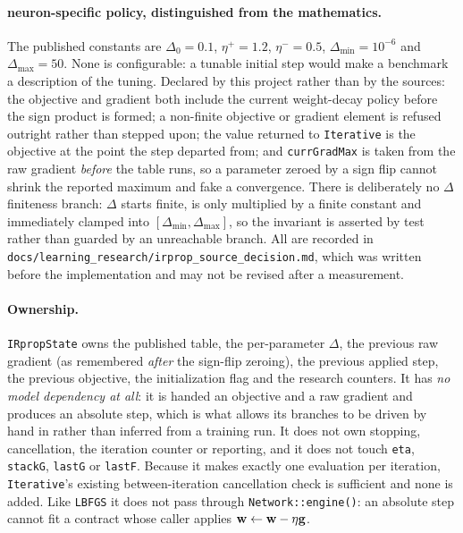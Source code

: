 \paragraph{neuron-specific policy, distinguished from the mathematics.}  The
published constants are $\Delta_0 = 0.1$, $\eta^{+} = 1.2$, $\eta^{-} = 0.5$,
$\Delta_{\min} = 10^{-6}$ and $\Delta_{\max} = 50$.  None is configurable: a
tunable initial step would make a benchmark a description of the tuning.
Declared by this project rather than by the sources: the objective and gradient
both include the current weight-decay policy before the sign product is formed;
a non-finite objective or gradient element is refused outright rather than
stepped upon; the value returned to \texttt{Iterative} is the objective at the
point the step departed from; and \texttt{currGradMax} is taken from the raw
gradient \emph{before} the table runs, so a parameter zeroed by a sign flip
cannot shrink the reported maximum and fake a convergence.  There is
deliberately no $\Delta$ finiteness branch: $\Delta$ starts finite, is only
multiplied by a finite constant and immediately clamped into
$[\Delta_{\min},\Delta_{\max}]$, so the invariant is asserted by test rather
than guarded by an unreachable branch.  All are recorded in
\texttt{docs/learning\_research/irprop\_source\_decision.md}, which was written
before the implementation and may not be revised after a measurement.

\paragraph{Ownership.}  \texttt{IRpropState} owns the published table, the
per-parameter $\Delta$, the previous raw gradient (as remembered \emph{after}
the sign-flip zeroing), the previous applied step, the previous objective, the
initialization flag and the research counters.  It has \emph{no model
dependency at all}: it is handed an objective and a raw gradient and produces an
absolute step, which is what allows its branches to be driven by hand in
 rather than inferred from a training run.
It does not own stopping, cancellation, the iteration counter or reporting, and
it does not touch \texttt{eta}, \texttt{stackG}, \texttt{lastG} or
\texttt{lastF}.  Because it makes exactly one evaluation per iteration,
\texttt{Iterative}'s existing between-iteration cancellation check is
sufficient and none is added.  Like \texttt{LBFGS} it does not pass through
\texttt{Network::engine()}: an absolute step cannot fit a contract whose caller
applies ${\bf w} \leftarrow {\bf w} - \eta{\bf g}$.

